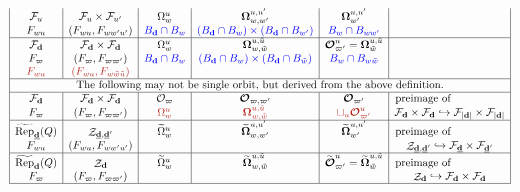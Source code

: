 \documentclass[border={7pt 0pt 200pt 0pt},varwidth]{standalone}
\DeclareMathOperator{\RRep}{\widetilde{\operatorname{Rep}}}
\DeclareMathOperator{\St}{\mathcal{Z}}
\newcommand{\dimvec}[1]{\mathbf{#1}}
\newcommand{\abdimvec}[1]{|\dimvec{#1}|}
\newcommand{\ftdimvec}[1]{\underline{\dimvec{#1}}}
\newcommand{\ww}{\varpi}
\newcommand{\Omcell}{\Omega}
\newcommand{\OOmcell}{\boldsymbol{\Omega}}
\newcommand{\Ocell}{\mathcal{O}}
\newcommand{\OOcell}{\boldsymbol{\mathcal{O}}}
\newcommand{\preimage}[1]{\widetilde{#1}}
\begin{document}
\begin{table}[ht]
\[\begin{array}{|c|c|c|c|c|c|}
  \mathcal{F}_{u} & \mathcal{F}_{u} \times \mathcal{F}_{u'} & \Omcell_{w}^{u} & \OOmcell_{w,w'}^{u,u'} & \OOmcell_{w'}^{u,u'} &\\
  F_{wu} & (F_{wu},F_{ww'u'}) & \textcolor{blue}{B_{\dimvec{d}} \cap B_{w} }& \textcolor{blue}{ \left(B_{\dimvec{d}} \cap B_{w}\right) \times \left(B_{\dimvec{d}} \cap B_{w'}\right) }& \textcolor{blue}{B_{w} \cap B_{ww'}} &\\\hline
  
  \mathcal{F}_{\dimvec{d}} & \mathcal{F}_{\dimvec{d}} \times \mathcal{F}_{\dimvec{d}} & \Omcell_{w}^{u} & \OOmcell_{w,\tilde{w}}^{u,\tilde{u}} & \OOcell_{\ww'}^{u}=\OOmcell_{\tilde{w}}^{u,\tilde{u}} &\\
  F_{\ww} & (F_{\ww},F_{\ww\ww'}) & \textcolor{blue}{B_{\dimvec{d}} \cap B_{w}} & \textcolor{blue}{\left(B_{\dimvec{d}} \cap B_{w}\right) \times \left(B_{\dimvec{d}} \cap B_{\tilde{w}}\right)} & \textcolor{blue}{B_{w} \cap B_{w\tilde{w}}} &\\
  \textcolor{BrickRed}{F_{wu}} & \textcolor{BrickRed}{(F_{wu},F_{w\tilde{w}\tilde{u}})} &  &  &  &\\ \hline 
  
  \multicolumn{6}{|c|}{\text{The following may not be single orbit, but derived from the above definition.}}\\ \hline
  
  \mathcal{F}_{\dimvec{d}} & \mathcal{F}_{\dimvec{d}} \times \mathcal{F}_{\dimvec{d}} & \Ocell_{\ww} & \OOcell_{\ww,\ww'} & \OOcell_{\ww'} & \text{preimage of \hspace{1.6cm}}\\
  F_{\ww} & (F_{\ww},F_{\ww\ww'}) & \textcolor{BrickRed}{\Omcell_{w}^{u}} & \textcolor{BrickRed}{\OOmcell_{w,\tilde{w}}^{u,\tilde{u}}} & \textcolor{BrickRed}{\sqcup_{u}\OOcell_{\ww'}^{u}} & \mathcal{F}_{\dimvec{d}} \times \mathcal{F}_{\dimvec{d}} \hookrightarrow \mathcal{F}_{\abdimvec{d}} \times \mathcal{F}_{\abdimvec{d}}\\\hline
  
  
  \RRep_{\ftdimvec{d}}(Q) & \St_{\ftdimvec{d},\ftdimvec{d}'} & \preimage{\Omcell}_{w}^{u} & \preimage{\OOmcell}_{w,w'}^{u,u'} & \preimage{\OOmcell}_{w'}^{u,u'} &\text{preimage of \hspace{1.6cm}}\\
  F_{wu} & (F_{wu},F_{ww'u'}) & & &  &\St_{\ftdimvec{d},\ftdimvec{d}'} \hookrightarrow \mathcal{F}_{\ftdimvec{d}} \times \mathcal{F}_{\ftdimvec{d}'}\\\hline

  \RRep_{\dimvec{d}}(Q) & \St_{\dimvec{d}} & \preimage{\Omcell}_{w}^{u} & \preimage{\OOmcell}_{w,\tilde{w}}^{u,\tilde{u}} & \preimage{\OOcell}_{\ww'}^{u}=\preimage{\OOmcell}_{\tilde{w}}^{u,\tilde{u}} &\text{preimage of \hspace{1.6cm}}\\
  F_{\ww} & (F_{\ww},F_{\ww\ww'}) & & &  &\St_{\dimvec{d}} \hookrightarrow \mathcal{F}_{\dimvec{d}} \times \mathcal{F}_{\dimvec{d}}\\\hline 
  

\end{array}\]
\end{table}
\end{document}
